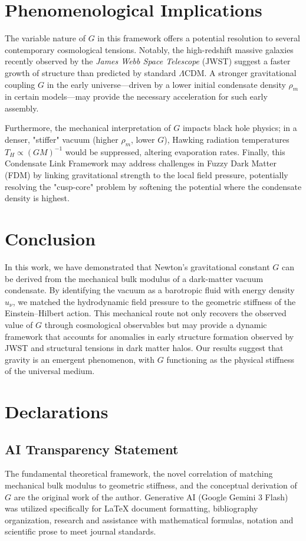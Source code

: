 \documentclass[11pt,a4paper]{article}
\begin{document}
\section{Phenomenological Implications}
The variable nature of $G$ in this framework offers a potential resolution to several contemporary cosmological tensions. Notably, the high-redshift massive galaxies recently observed by the \textit{James Webb Space Telescope} (JWST) suggest a faster growth of structure than predicted by standard $\Lambda$CDM.\cite{BoylanKolchin2023} A stronger gravitational coupling $G$ in the early universe—driven by a lower initial condensate density $\rho_m$ in certain models—may provide the necessary acceleration for such early assembly. 


Furthermore, the mechanical interpretation of $G$ impacts black hole physics; in a denser, "stiffer" vacuum (higher $\rho_m$, lower $G$), Hawking radiation temperatures $T_H \propto (GM)^{-1}$ would be suppressed, altering evaporation rates. Finally, this Condensate Link Framework may address challenges in Fuzzy Dark Matter (FDM) by linking gravitational strength to the local field pressure, potentially resolving the "cusp-core" problem by softening the potential where the condensate density is highest.



\section{Conclusion}
In this work, we have demonstrated that Newton's gravitational constant $G$ can be derived from the mechanical bulk modulus of a dark-matter vacuum condensate. By identifying the vacuum as a barotropic fluid with energy density $u_\nu$, we matched the hydrodynamic field pressure to the geometric stiffness of the Einstein--Hilbert action. This mechanical route not only recovers the observed value of $G$ through cosmological observables but may provide a dynamic framework that accounts for anomalies in early structure formation observed by JWST and structural tensions in dark matter halos. Our results suggest that gravity is an emergent phenomenon, with $G$ functioning as the physical stiffness of the universal medium.

\section*{Declarations}
\subsection*{AI Transparency Statement}
The fundamental theoretical framework, the novel correlation of matching mechanical bulk modulus to geometric stiffness, and the conceptual derivation of $G$ are the original work of the author. Generative AI (Google Gemini 3 Flash) was utilized specifically for LaTeX document formatting, bibliography organization, research and assistance with mathematical formulas, notation and scientific prose to meet journal standards.
\end{document}
